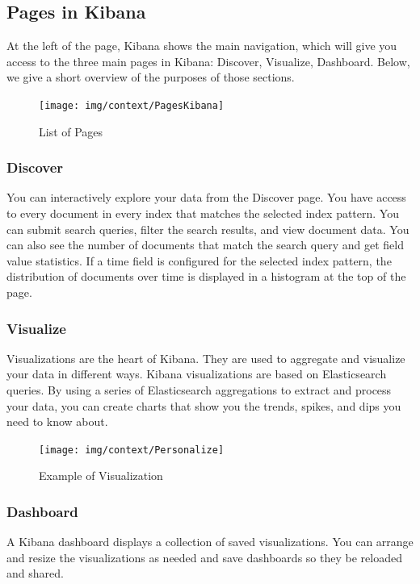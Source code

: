 \documentclass[a4paper, 12pt]{book}
\begin{document}
\subsection{Pages in Kibana}
At the left of the page, Kibana shows the main navigation, which will give you access to the three main pages in Kibana: Discover, Visualize, Dashboard. Below, we give a short overview of the purposes of those sections.


\begin{figure}[H]
  \centering
  \texttt{[image: img/context/PagesKibana]}
  \caption{List of Pages}
  \label{fig:pageskibana}
\end{figure}

\subsubsection{Discover}
You can interactively explore your data from the Discover page. You have access to every document in every index that matches the selected index pattern. You can submit search queries, filter the search results, and view document data. You can also see the number of documents that match the search query and get field value statistics. If a time field is configured for the selected index pattern, the distribution of documents over time is displayed in a histogram at the top of the page.

\subsubsection{Visualize}
Visualizations are the heart of Kibana. They are used to aggregate and visualize your data in different ways. Kibana visualizations are based on Elasticsearch queries. By using a series of Elasticsearch aggregations to extract and process your data, you can create charts that show you the trends, spikes, and dips you need to know about.

\begin{figure}[H]
  \centering
  \texttt{[image: img/context/Personalize]}
  \caption{Example of Visualization}
  \label{fig:visualizeex}
\end{figure}


\subsubsection{Dashboard}
A Kibana dashboard displays a collection of saved visualizations. You can arrange and resize the visualizations as needed and save dashboards so they be reloaded and shared.
\end{document}
